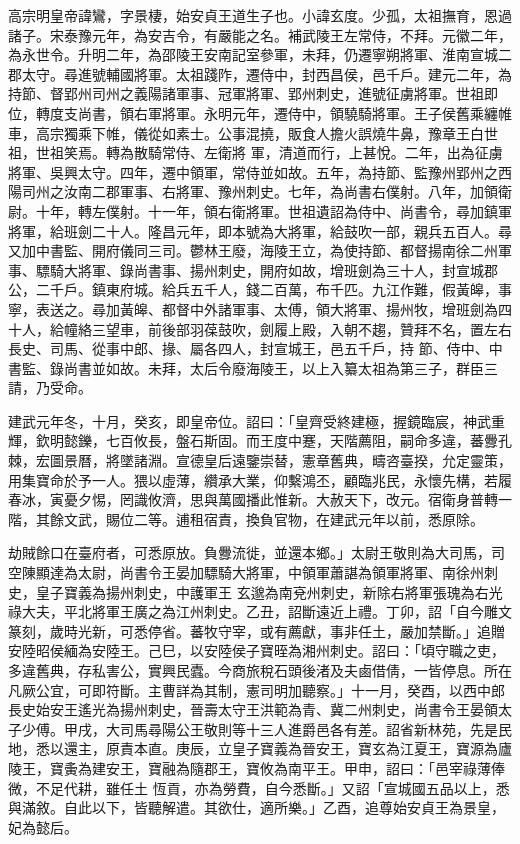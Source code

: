 
\begin{pinyinscope}

 高宗明皇帝諱鸞，字景棲，始安貞王道生子也。小諱玄度。少孤，太祖撫育，恩過諸子。宋泰豫元年，為安吉令，有嚴能之名。補武陵王左常侍，不拜。元徽二年，為永世令。升明二年，為邵陵王安南記室參軍，未拜，仍遷寧朔將軍、淮南宣城二郡太守。尋進號輔國將軍。太祖踐阼，遷侍中，封西昌侯，邑千戶。建元二年，為持節、督郢州司州之義陽諸軍事、冠軍將軍、郢州刺史，進號征虜將軍。世祖即位，轉度支尚書，領右軍將軍。永明元年，遷侍中，領驍騎將軍。王子侯舊乘纏帷車，高宗獨乘下帷，儀從如素士。公事混撓，販食人擔火誤燒牛鼻，豫章王白世祖，世祖笑焉。轉為散騎常侍、左衛將
 軍，清道而行，上甚悅。二年，出為征虜將軍、吳興太守。四年，遷中領軍，常侍並如故。五年，為持節、監豫州郢州之西陽司州之汝南二郡軍事、右將軍、豫州刺史。七年，為尚書右僕射。八年，加領衛尉。十年，轉左僕射。十一年，領右衛將軍。世祖遺詔為侍中、尚書令，尋加鎮軍將軍，給班劍二十人。隆昌元年，即本號為大將軍，給鼓吹一部，親兵五百人。尋又加中書監、開府儀同三司。鬱林王廢，海陵王立，為使持節、都督揚南徐二州軍事、驃騎大將軍、錄尚書事、揚州刺史，開府如故，增班劍為三十人，封宣城郡公，二千戶。鎮東府城。給兵五千人，錢二百萬，布千匹。九江作難，假黃皞，事寧，表送之。尋加黃皞、都督中外諸軍事、太傅，領大將軍、揚州牧，增班劍為四十人，給幢絡三望車，前後部羽葆鼓吹，劍履上殿，入朝不趨，贊拜不名，置左右長史、司馬、從事中郎、掾、屬各四人，封宣城王，邑五千戶，持
 節、侍中、中書監、錄尚書並如故。未拜，太后令廢海陵王，以上入纂太祖為第三子，群臣三請，乃受命。



 建武元年冬，十月，癸亥，即皇帝位。詔曰：「皇齊受終建極，握鏡臨宸，神武重輝，欽明懿鑠，七百攸長，盤石斯固。而王度中蹇，天階薦阻，嗣命多違，蕃釁孔棘，宏圖景曆，將墜諸淵。宣德皇后遠鑒崇替，憲章舊典，疇咨臺揆，允定靈策，用集寶命於予一人。猥以虛薄，纘承大業，仰繫鴻丕，顧臨兆民，永懷先構，若履春冰，寅憂夕惕，罔識攸濟，思與萬國播此惟新。大赦天下，改元。宿衛身普轉一階，其餘文武，賜位二等。逋租宿責，換負官物，在建武元年以前，悉原除。



 劫賊餘口在臺府者，可悉原放。負釁流徙，並還本鄉。」太尉王敬則為大司馬，司空陳顯達為太尉，尚書令王晏加驃騎大將軍，中領軍蕭諶為領軍將軍、南徐州刺史，皇子寶義為揚州刺史，中護軍王
 玄邈為南兗州刺史，新除右將軍張瑰為右光祿大夫，平北將軍王廣之為江州刺史。乙丑，詔斷遠近上禮。丁卯，詔「自今雕文篆刻，歲時光新，可悉停省。蕃牧守宰，或有薦獻，事非任土，嚴加禁斷。」追贈安陸昭侯緬為安陸王。己巳，以安陸侯子寶晊為湘州刺史。詔曰：「頃守職之吏，多違舊典，存私害公，實興民蠹。今商旅稅石頭後渚及夫鹵借倩，一皆停息。所在凡厥公宜，可即符斷。主曹詳為其制，憲司明加聽察。」十一月，癸酉，以西中郎長史始安王遙光為揚州刺史，晉壽太守王洪範為青、冀二州刺史，尚書令王晏領太子少傅。甲戌，大司馬尋陽公王敬則等十三人進爵邑各有差。詔省新林苑，先是民地，悉以還主，原責本直。庚辰，立皇子寶義為晉安王，寶玄為江夏王，寶源為廬陵王，寶夤為建安王，寶融為隨郡王，寶攸為南平王。甲申，詔曰：「邑宰祿薄俸微，不足代耕，雖任土
 恆貢，亦為勞費，自今悉斷。」又詔「宣城國五品以上，悉與滿敘。自此以下，皆聽解遣。其欲仕，適所樂。」乙酉，追尊始安貞王為景皇，妃為懿后。




\end{pinyinscope}
